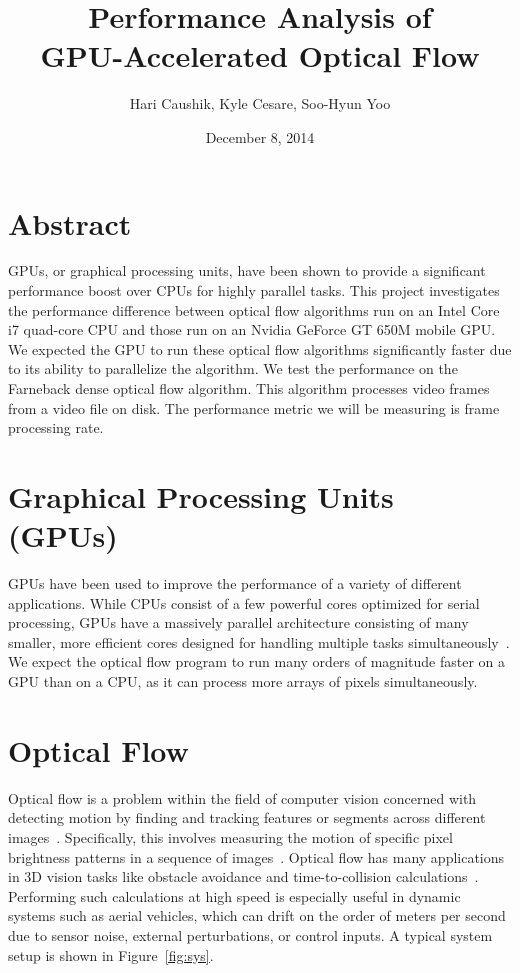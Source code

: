\documentclass[12pt,letterpaper]{article}
\title{Performance Analysis of \\ GPU-Accelerated Optical Flow}
\date{December 8, 2014}
\author{Hari Caushik, Kyle Cesare, Soo-Hyun Yoo}
\begin{document}
\maketitle
\thispagestyle{empty}
\newpage

\tableofcontents
\newpage

\section{Abstract}
GPUs, or graphical processing units, have been shown to provide a significant
performance boost over CPUs for highly parallel tasks\cite{gpupipeline}. This
project investigates the performance difference between optical flow algorithms
run on an Intel Core i7 quad-core CPU and those run on an Nvidia GeForce GT 650M
mobile GPU. We expected the GPU to run these optical flow algorithms
significantly faster due to its ability to parallelize the algorithm. We test
the performance on the Farneback dense optical flow algorithm. This algorithm
processes video frames from a video file on disk. The performance metric we will
be measuring is frame processing rate.

\section{Graphical Processing Units (GPUs)}
GPUs have been used to improve the performance of a variety of different
applications. While CPUs consist of a few powerful cores optimized for serial
processing, GPUs have a massively parallel architecture consisting of many
smaller, more efficient cores designed for handling multiple tasks
simultaneously~\cite{gpuoverview}. We expect the optical flow program to run many
orders of magnitude faster on a GPU than on a CPU, as it can process more arrays
of pixels simultaneously.

\section{Optical Flow}
Optical flow is a problem within the field of computer vision concerned with
detecting motion by finding and tracking features or segments across different
images~\cite{opticalflowtechniques}. Specifically, this involves measuring the
motion of specific pixel brightness patterns in a sequence of
images~\cite{opticalflowtechniques}. Optical flow has many applications in 3D
vision tasks like obstacle avoidance and time-to-collision
calculations~\cite{opticalflowtechniques}.  Performing such calculations at high
speed is especially useful in dynamic systems such as aerial vehicles, which can
drift on the order of meters per second due to sensor noise, external
perturbations, or control inputs.  A typical system setup is shown in
Figure~\ref{fig:sys}.
\end{document}
